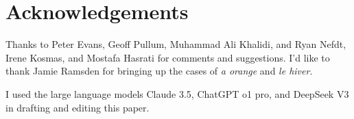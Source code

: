 \documentclass[12pt,letterpaper]{article}
\begin{document}
\newpage
\section*{Acknowledgements}
Thanks to Peter Evans, Geoff Pullum, Muhammad Ali Khalidi, and Ryan Nefdt, Irene Kosmas, and Mostafa Hasrati for comments and suggestions. I'd like to thank Jamie Ramsden for bringing up the cases of \textit{a orange} and \textit{le hiver}.

I used the large language models Claude 3.5, ChatGPT o1 pro, and DeepSeek V3 in drafting and editing this paper.

\newpage
\begin{sloppypar}
\printbibliography[title=References]
\end{sloppypar}
\end{document}
